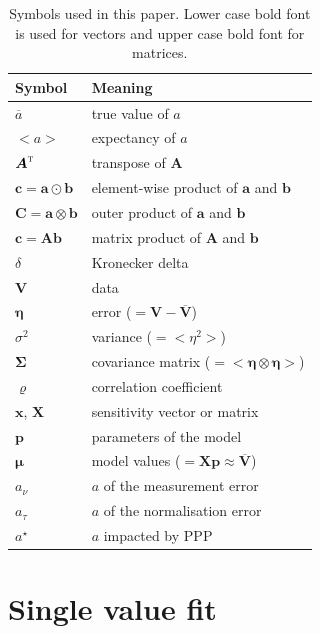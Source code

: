 \documentclass[a4paper,fleqn,usenatbib]{mnras}
\def\vec#1{\ensuremath{\boldsymbol{#1}}}
\def\tr#1{\ensuremath{{#1}^\text{\textsc{t}}}}
\def\expect#1{\ensuremath{ {<#1>} }}
\def\ppp#1{#1^\star}
\def\norm{_\tau}
\def\meas{_\nu}
\def\mean#1{\overline{#1}}
\let\outer=\otimes
\let\hadam=\odot
\def\data{\ensuremath{{\scriptstyle V}}}
\def\vdata{\ensuremath{\vec\data}}
\def\vdatamean{\ensuremath{\mean\vdata}}
\def\vmod{\ensuremath{\vec\mu}}
\def\error{\ensuremath{\eta}}
\def\verror{\ensuremath{\vec\error}}
\def\dev{\ensuremath{\sigma}}
\def\cov{\ensuremath{\Sigma}}
\def\vcov{\ensuremath{\vec\cov}}
\def\corr{\ensuremath{\varrho}}
\def\sens{\ensuremath{x}}
\def\vsens{\ensuremath{\vec\sens}}
\def\msens{\ensuremath{\vec X}}
\def\param{\ensuremath{p}}
\def\vparam{\ensuremath{\vec\param}}
\begin{document}
\begin{table}
\caption{Symbols used in this paper. Lower case bold font is used for vectors and upper case bold font for matrices.}
\begin{tabular}{ll}
\hline\hline
Symbol                        & Meaning\\
\hline
$\mean a$                     & true value of $a$\\
$<a>$                         & expectancy of $a$\\
$\tr{\vec A}$                 & transpose of $\vec A$\\
$\vec c = \vec a\hadam\vec b$ & element-wise product of $\vec a$ and $\vec b$\\
$\vec C = \vec a\outer\vec b$ & outer product of $\vec a$ and $\vec b$\\
$\vec c = \vec A\vec b$       & matrix product of $\vec A$ and $\vec b$\\
$\delta$                      & Kronecker delta\\
\hline
$\vdata$                      & data\\ 
$\verror$                     & error ($= \vdata - \vdatamean$)\\
$\dev^2$                      & variance ($= \expect{\error^2}$)\\
$\vcov$                       & covariance matrix ($= \expect{\verror\outer\verror}$)\\
$\corr$                       & correlation coefficient\\
$\vsens$, $\msens$            & sensitivity vector or matrix\\
$\vparam$                     & parameters of the model\\
$\vmod$                       & model values ($= \msens\vparam\approx\vdatamean$)\\
\hline
$a\meas$                      & $a$ of the measurement error\\
$a\norm$                      & $a$ of the normalisation error\\
$\ppp a$                      & $a$ impacted by PPP\\
\hline
\end{tabular}
\end{table}

\section{Single value fit}
\label{sec:single} 
\end{document}
